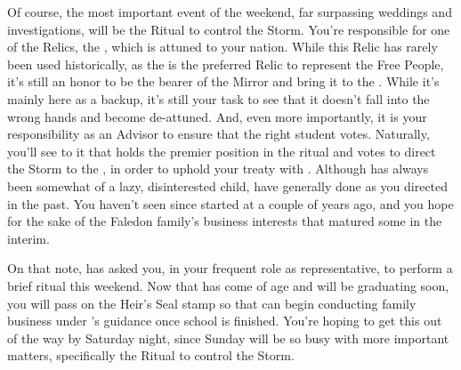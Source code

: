 \documentclass[char]{GL2020}
\begin{document}
Of course, the most important event of the weekend, far surpassing weddings and investigations, will be the Ritual to control the Storm. You’re responsible for one of the Relics, the \iMirror{}, which is attuned to your nation. While this Relic has rarely been used historically, as the \iLariat{} is the preferred Relic to represent the Free People, it’s still an honor to be the bearer of the Mirror and bring it to the \pSc{}. While it’s mainly here as a backup, it’s still your task to see that it doesn’t fall into the wrong hands and become de-attuned. And, even more importantly, it is your responsibility as an Advisor to ensure that the right student votes.  Naturally, you’ll see to it that \cHeir{} holds the premier position in the ritual and votes to direct the Storm to the \pShip{}, in order to uphold your treaty with \pFarm{}. Although \cHeir{} has always been somewhat of a lazy, disinterested child, \cHeir{\they} have generally done as you directed in the past. You haven’t seen \cHeir{\them} since \cHeir{\they} started at \pSchool{} a couple of years ago, and you hope for the sake of the Faledon family’s business interests that  matured some in the interim.  

On that note, \cFaledonParent{} has asked you, in your frequent role as \cFaledonParent{\their} representative, to perform a brief ritual this weekend.  Now that \cHeir{} has come of age and will be graduating soon, you will pass on the Heir’s Seal stamp so that \cHeir{} can begin conducting family business under \cFaledonParent{}’s guidance once school is finished.  You’re hoping to get this out of the way by Saturday night, since Sunday will be so busy with more important matters, specifically the Ritual to control the Storm.
\end{document}
